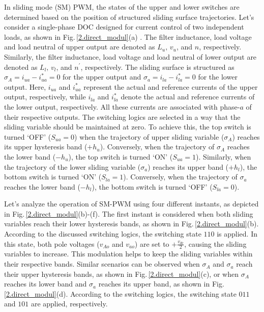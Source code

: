 In sliding mode (SM) PWM, the states of the upper and lower switches are determined based on the position of structured sliding surface trajectories. Let's consider a single-phase DOC designed for current control of two independent loads, as shown in Fig.\,\ref{2.direct_modul}(a) \cite{6563653}. The filter inductance, load voltage and load neutral of upper output are denoted as $L_u, \, v_u$, and $n$, respectively. Similarly, the filter inductance, load voltage and load neutral of lower output are denoted as $L_l, \, v_l$, and $n^{\prime}$, respectively. The sliding surface is structured as $\sigma_{A} = i_{ua} - i^{*}_{ua} = 0$ for the upper output and $\sigma_{a} = i_{la} - i^{*}_{la} = 0$ for the lower output. Here, $i_{ua}$ and $i^{*}_{ua}$ represent the actual and reference currents of the upper output, respectively, while $i_{la}$ and $i^{*}_{la}$ denote the actual and reference currents of the lower output, respectively. All these currents are associated with phase-$a$ of their respective outputs. The switching logics are selected in a way that the sliding variable should be maintained at zero. To achieve this, the top switch is turned `OFF' ($S_{ua}=0$) when the trajectory of upper sliding variable ($\sigma_{A}$) reaches its upper hysteresis band ($+h_{u}$). Conversely, when the trajectory of $\sigma_{A}$ reaches the lower band ($-h_{u}$), the top switch is turned `ON' ($S_{ua}=1$). Similarly, when the trajectory of the lower sliding variable ($\sigma_{a}$) reaches its upper band ($+h_{l}$), the bottom switch is turned `ON' ($S_{la}=1$). Conversely, when the trajectory of $\sigma_{a}$ reaches the lower band ($-h_{l}$), the bottom switch is turned `OFF' ($S_{la}=0$). 

Let's analyze the operation of SM-PWM using four different instants, as depicted in Fig.\,\ref{2.direct_modul}(b)-(f). The first instant is considered when both sliding variables reach their lower hysteresis bands, as shown in Fig.\,\ref{2.direct_modul}(b). According to the discussed switching logics, the switching state $110$ is applied. In this state, both pole voltages ($v_{Ao}$ and $v_{ao}$) are set to $+\frac{v_{dc}}{2}$, causing the sliding variables to increase. This modulation helps to keep the sliding variables within their respective bands. Similar scenarios can be observed when $\sigma_{A}$ and $\sigma_{a}$ reach their upper hysteresis bands, as shown in Fig.\,\ref{2.direct_modul}(c), or when $\sigma_{A}$ reaches its lower band and $\sigma_{a}$ reaches its upper band, as shown in Fig.\,\ref{2.direct_modul}(d). According to the switching logics, the switching state $011$ and $101$ are applied, respectively.

